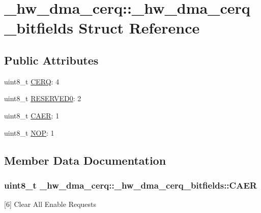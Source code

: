 \hypertarget{struct__hw__dma__cerq_1_1__hw__dma__cerq__bitfields}{}\section{\+\_\+hw\+\_\+dma\+\_\+cerq\+:\+:\+\_\+hw\+\_\+dma\+\_\+cerq\+\_\+bitfields Struct Reference}
\label{struct__hw__dma__cerq_1_1__hw__dma__cerq__bitfields}
\subsection*{Public Attributes}
\begin{DoxyCompactItemize}
\item 
uint8\+\_\+t \hyperlink{struct__hw__dma__cerq_1_1__hw__dma__cerq__bitfields_a6f0823169a385c91dbbb80a733b55156}{C\+E\+RQ}\+: 4
\item 
uint8\+\_\+t \hyperlink{struct__hw__dma__cerq_1_1__hw__dma__cerq__bitfields_af54136955154647d465ae418721b49de}{R\+E\+S\+E\+R\+V\+E\+D0}\+: 2
\item 
uint8\+\_\+t \hyperlink{struct__hw__dma__cerq_1_1__hw__dma__cerq__bitfields_aba9c401aeee4b0e6e940202343d080cb}{C\+A\+ER}\+: 1
\item 
uint8\+\_\+t \hyperlink{struct__hw__dma__cerq_1_1__hw__dma__cerq__bitfields_a1a3a3088aea9eab35f27b0cc12988d6f}{N\+OP}\+: 1
\end{DoxyCompactItemize}


\subsection{Member Data Documentation}
\subsubsection[{\texorpdfstring{C\+A\+ER}{CAER}}]{\setlength{\rightskip}{0pt plus 5cm}uint8\+\_\+t \+\_\+hw\+\_\+dma\+\_\+cerq\+::\+\_\+hw\+\_\+dma\+\_\+cerq\+\_\+bitfields\+::\+C\+A\+ER}\hypertarget{struct__hw__dma__cerq_1_1__hw__dma__cerq__bitfields_aba9c401aeee4b0e6e940202343d080cb}{}\label{struct__hw__dma__cerq_1_1__hw__dma__cerq__bitfields_aba9c401aeee4b0e6e940202343d080cb}
\mbox{[}6\mbox{]} Clear All Enable Requests 
